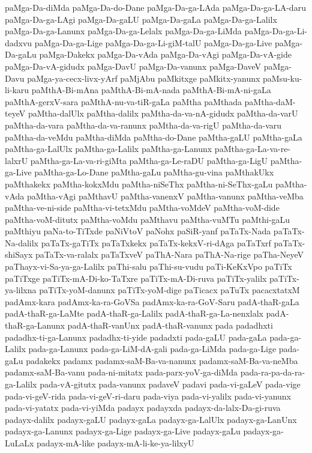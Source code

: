 {paMga-Da-diMda
paMga-Da-do-Dane
paMga-Da-ga-LAda
paMga-Da-ga-LA-daru
paMga-Da-ga-LAgi
paMga-Da-gaLU
paMga-Da-gaLa
paMga-Da-ga-Lalilx
paMga-Da-ga-Lanunx
paMga-Da-ga-Lelalx
paMga-Da-ga-LiMda
paMga-Da-ga-Li-dadxvu
paMga-Da-ga-Lige
paMga-Da-ga-Li-giM-talU
paMga-Da-ga-Live
paMga-Da-gaLu
paMga-Dakekx
paMga-Da-vAda
paMga-Da-vAgi
paMga-Da-vA-gide
paMga-Da-vA-gidudx
paMga-DavU
paMga-Da-vanunx
paMga-DaveV
paMga-Davu
paMga-ya-cecx-livx-yArf
paMjAbu
paMkitxge
paMkitx-yanunx
paMsu-ku-li-karu
paMthA-Bi-mAna
paMthA-Bi-mA-nada
paMthA-Bi-mA-ni-gaLa
paMthA-gerxV-sara
paMthA-nu-va-tiR-gaLa
paMtha
paMthada
paMtha-daM-teyeV
paMtha-dalUlx
paMtha-dalilx
paMtha-da-va-nA-gidudx
paMtha-da-varU
paMtha-da-vara
paMtha-da-va-ranunx
paMtha-da-va-rigU
paMtha-da-varu
paMtha-da-veMdu
paMtha-diMda
paMtha-do-Dane
paMtha-gaLU
paMtha-gaLa
paMtha-ga-LalUlx
paMtha-ga-Lalilx
paMtha-ga-Lanunx
paMtha-ga-La-va-re-lalxrU
paMtha-ga-La-va-ri-giMta
paMtha-ga-Le-raDU
paMtha-ga-LigU
paMtha-ga-Live
paMtha-ga-Lo-Dane
paMtha-gaLu
paMtha-gu-vina
paMthakUkx
paMthakekx
paMtha-kokxMdu
paMtha-niSeThx
paMtha-ni-SeThx-gaLu
paMtha-vAda
paMtha-vAgi
paMthavU
paMtha-vanenxV
paMtha-vanunx
paMtha-veMba
paMtha-ve-ni-side
paMtha-vi-tetxMdu
paMtha-voMdeV
paMtha-voM-dide
paMtha-voM-ditutx
paMtha-voMdu
paMthavu
paMtha-vuMTu
paMthi-gaLu
paMthiyu
paNa-to-TiTxde
paNiVtoV
paNohx
paSiR-yanf
paTaTx-Nada
paTaTx-Na-dalilx
paTaTx-gaTiTx
paTaTxkekx
paTaTx-kekxV-ri-dAga
paTaTxrf
paTaTx-shiSayx
paTaTx-va-ralalx
paTaTxveV
paThA-Nara
paThA-Na-rige
paTha-NeyeV
paThayx-vi-Sa-ya-ga-Lalilx
paThi-salu
paThi-su-vudu
paTi-KeKxVpo
paTiTx
paTiTxge
paTiTx-mA-Di-ko-TaTxre
paTiTx-mA-Di-ruva
paTiTx-yalilx
paTiTx-ya-lilxna
paTiTx-yoM-danunx
paTiTx-yoM-dige
paTicacx
paTuTx
pacacxtatxM
padAmx-kara
padAmx-ka-ra-GoVSa
padAmx-ka-ra-GoV-Saru
padA-thaR-gaLa
padA-thaR-ga-LaMte
padA-thaR-ga-Lalilx
padA-thaR-ga-La-nenxlalx
padA-thaR-ga-Lanunx
padA-thaR-vanUnx
padA-thaR-vanunx
pada
padadhxti
padadhx-ti-ga-Lanunx
padadhx-ti-yide
padadxti
pada-gaLU
pada-gaLa
pada-ga-Lalilx
pada-ga-Lanunx
pada-ga-LiM-dA-gali
pada-ga-LiMda
pada-ga-Lige
pada-gaLu
padakekx
padamx
padamx-saM-Ba-va-nanunx
padamx-saM-Ba-va-neMba
padamx-saM-Ba-vanu
pada-ni-mitatx
pada-parx-yoV-ga-diMda
pada-ra-pa-da-ra-ga-Lalilx
pada-vA-gitutx
pada-vanunx
padaveV
padavi
pada-vi-gaLeV
pada-vige
pada-vi-geV-rida
pada-vi-geV-ri-daru
pada-viya
pada-vi-yalilx
pada-vi-yanunx
pada-vi-yatatx
pada-vi-yiMda
padayx
padayxda
padayx-da-lalx-Da-gi-ruva
padayx-dalilx
padayx-gaLU
padayx-gaLa
padayx-ga-LalUlx
padayx-ga-LanUnx
padayx-ga-Lanunx
padayx-ga-Lige
padayx-ga-Live
padayx-gaLu
padayx-ga-LuLaLx
padayx-mA-like
padayx-mA-li-ke-ya-lilxyU
}
